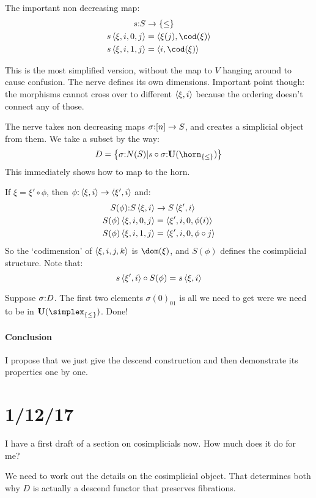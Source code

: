 \documentclass[csh.tex]{subfiles}
\begin{document}
The important non decreasing map:
\begin{align*}
s\of S &\to \set\leq\\
s\tuplet{\xi,i,0,j} &= \tuplet{\xi(j),\cod(\xi)}\\
s\tuplet{\xi,i,1,j} &= \tuplet{i,\cod(\xi)}\\
\end{align*}


This is the most simplified version, without the map to $V$ hanging around to cause confusion.
The nerve defines its own dimensions. Important point though: the morphisms cannot cross over to different $\left\langle \xi,i \right\rangle$ because the ordering doesn't connect any of those. 

The nerve takes non decreasing maps $\sigma\mathord :[n]\to S$, and creates a simplicial object from them. We take a subset by the way: 
\[ D = \set{ \sigma\of N(S)|s\circ \sigma \of \base(\horn_{\set\leq}) }\]
This immediately shows how to map to the horn. 

If $\xi = \xi' \circ \phi$, then $\phi\mathord :\left\langle \xi,i \right\rangle\to\left\langle \xi',i \right\rangle$ and: 
\begin{align*}
S(\phi)\mathord : S\left\langle \xi,i \right\rangle&\to S\left\langle \xi',i \right\rangle\\
S(\phi)\left\langle \xi,i,0,j \right\rangle &= \left\langle \xi',i,0,\phi(i) \right\rangle\\
S(\phi)\left\langle \xi,i,1,j \right\rangle &= \left\langle \xi',i,0,\phi\circ j \right\rangle
\end{align*}
So the `codimension' of $\left\langle \xi,i,j,k \right\rangle$ is $\dom(\xi)$, and $S(\phi)$ defines the cosimplicial structure. Note that:
\[ s\left\langle \xi',i \right\rangle\circ S(\phi) = s\left\langle \xi,i \right\rangle\]

Suppose $\sigma \mathord : D$. The first two elements $\sigma(0)_{01}$ is all we need to get were we need to be in $\base(\simplex_{\set\leq})$. Done!

\paragraph{Conclusion}
I propose that we just give the descend construction and then demonstrate its properties one by one.

\section{1/12/17}
I have a first draft of a section on cosimplicials now. How much does it do for me?

We need to work out the details on the cosimplicial object. That determines both why $D$ is actually a descend functor that preserves fibrations.
\end{document}
